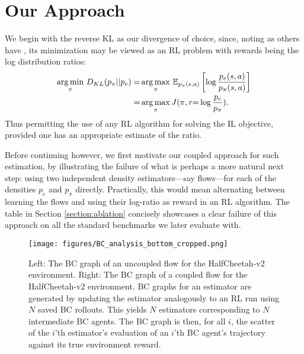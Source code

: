 \section{Our Approach}\label{sec:our_approach}
We begin with the reverse KL as our divergence of choice, since, noting as others have \cite{kostrikov2019imitation,hazan2019provably,kim2021imitation,camacho2021sparsedice}, its minimization may be viewed as an RL problem with rewards being the log distribution ratios:
\begin{align}
    \operatorname*{arg\,min}_{\pi}\,D_{KL}(p_\pi||p_e) =& \operatorname*{arg\,max}_{\pi}\,\mathbb{E}_{p_\pi(s,a)}\left[\log \frac{p_e(s,a)}{p_\pi(s,a)} \right] \nonumber \\=& 
    \operatorname*{arg\,max}_{\pi}J(\pi, r{=}\log \frac{p_e}{p_\pi}).\label{eq:rKL}
\end{align}
Thus permitting the use of any RL algorithm for solving the IL objective, provided one has an appropriate estimate of the ratio.

Before continuing however, we first motivate our coupled approach for such estimation, by illustrating the failure of what is perhaps a more natural next step: using two independent density estimators—say flows—for each of the densities $p_e$ and $p_\pi$ directly. Practically, this would mean alternating between learning the flows %
and using their log-ratio as reward in an RL algorithm. The table in Section \ref{section:ablation} concisely showcases a clear failure of this approach on all the standard benchmarks we later evaluate with.


\begin{figure}[t]
\vskip 0.1in
\centering
\texttt{[image: figures/BC\_analysis\_bottom\_cropped.png]} %
\caption{Left: The BC graph of an uncoupled flow for the HalfCheetah-v2 environment. Right: The BC graph of a coupled flow for the HalfCheetah-v2 environment. BC graphs for an estimator are generated by updating the estimator analogously to an RL run using $N$ saved BC rollouts. This yields $N$ estimators corresponding to $N$ intermediate BC agents. The BC graph is then, for all $i$, the scatter of the $i$’th estimator’s evaluation of an $i$’th BC agent's trajectory against its true environment reward.}
\label{fig:ind_flows_failure_and_bc}
\vskip -0.1in
\end{figure} 




